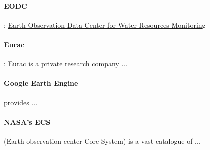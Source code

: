 \paragraph{EODC}: \href{https://www.eodc.eu/}{Earth Observation Data Center for Water Resources Monitoring}

\paragraph{Eurac}: \href{http://www.eurac.edu}{Eurac} is a private research company ...

\paragraph{Google Earth Engine} provides ...

\paragraph{NASA's ECS} (Earth observation center Core System) is a vast catalogue of ...